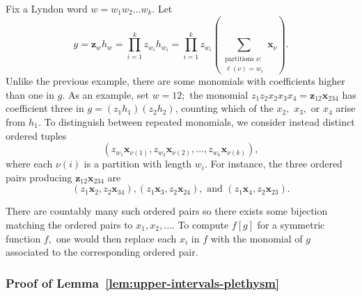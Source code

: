 \documentclass[ALCO, Unicode]{cedram}
\begin{document}
\begin{exam} \label{ex:total-ordering-zwhw}
 Fix a Lyndon word $w = w_1w_2 \ldots w_k.$ Let \[g = \mathbf{z}_wh_w = \prod_{i = 1}^kz_{w_i}h_{w_i} = \prod_{i= 1}^k z_{w_i} \left(\sum_{\substack{\text{partitions }\nu:\\ \ell(\nu) = w_i}}\mathbf{x}_{\nu}\right).\] Unlike the previous example, there are some monomials with coefficients higher than one in $g.$ As an example, set $w = 12;$  the monomial $z_1z_2x_{2}x_3x_4 = \mathbf{z}_{12}\mathbf{x}_{234}$ has coefficient three in $g = (z_1h_1)(z_2h_2)$, counting which of the $x_2,$ $x_3,$ or $x_4$ arise from $h_1.$ To distinguish between repeated monomials, we consider instead distinct ordered tuples \[(z_{w_1}\mathbf{x}_{\nu(1)}, z_{w_2}\mathbf{x}_{\nu(2)}, \ldots, z_{w_k}\mathbf{x}_{\nu(k)}),\] where each $\nu(i)$ is a partition with length $w_i.$ For instance, the three ordered pairs producing $\mathbf{z}_{12}\mathbf{x}_{234}$ are \[(z_1\mathbf{x}_2, z_2\mathbf{x}_{34}), 
     (z_1\mathbf{x}_{3}, z_2 \mathbf{x}_{24}), \text{ and } (z_1 \mathbf{x}_4, z_2\mathbf{x}_{23}).\]

     There are countably many such ordered pairs so there exists some bijection matching the ordered pairs to $x_1, x_2, \ldots.$ To compute $f[g]$ for a symmetric function $f,$ one would then replace each $x_i$ in $f$ with the monomial of $g$ associated to the corresponding ordered pair.
\end{exam}

\subsubsection{Proof of Lemma~\ref{lem:upper-intervals-plethysm}} \label{sec:reduction-of-base-case}
\end{document}
